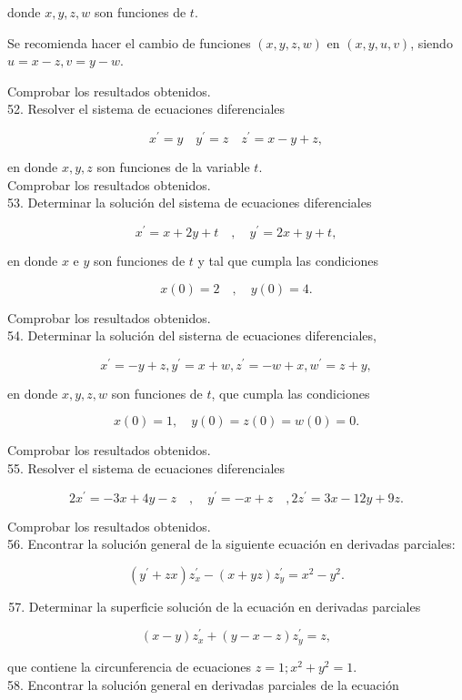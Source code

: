 \documentclass[10pt]{article}
\theoremstyle{plain}
\theoremstyle{definition}
\theoremstyle{remark}
\begin{document}
donde $x, y, z, w$ son funciones de $t$.


Se recomienda hacer el cambio de funciones $(x, y, z, w)$ en $(x, y, u, v)$, siendo $u=x-z, v=y-w$.

Comprobar los resultados obtenidos.\\
52. Resolver el sistema de ecuaciones diferenciales

$$
x^{\prime}=y \quad y^{\prime}=z \quad z^{\prime}=x-y+z,
$$

en donde $x, y, z$ son funciones de la variable $t$.\\
Comprobar los resultados obtenidos.\\
53. Determinar la solución del sistema de ecuaciones diferenciales

$$
x^{\prime}=x+2 y+t \quad, \quad y^{\prime}=2 x+y+t,
$$

en donde $x$ e $y$ son funciones de $t$ y tal que cumpla las condiciones

$$
x(0)=2 \quad, \quad y(0)=4 .
$$

Comprobar los resultados obtenidos.\\
54. Determinar la solución del sisterna de ecuaciones diferenciales,

$$
x^{\prime}=-y+z, y^{\prime}=x+w, z^{\prime}=-w+x, w^{\prime}=z+y,
$$

en donde $x, y, z, w$ son funciones de $t$, que cumpla las condiciones

$$
x(0)=1, \quad y(0)=z(0)=w(0)=0 .
$$

Comprobar los resultados obtenidos.\\
55. Resolver el sistema de ecuaciones diferenciales

$$
2 x^{\prime}=-3 x+4 y-z \quad, \quad y^{\prime}=-x+z \quad, 2 z^{\prime}=3 x-12 y+9 z .
$$

Comprobar los resultados obtenidos.\\
56. Encontrar la solución general de la siguiente ecuación en derivadas parciales:

$$
\left(y^{\prime}+z x\right) z_{x}^{\prime}-(x+y z) z_{y}^{\prime}=x^{2}-y^{2} .
$$

\begin{enumerate}
  \setcounter{enumi}{56}
  \item Determinar la superficie solución de la ecuación en derivadas parciales
\end{enumerate}

$$
(x-y) z_{x}^{\prime}+(y-x-z) z_{y}^{\prime}=z,
$$

que contiene la circunferencia de ecuaciones $z=1 ; x^{2}+y^{2}=1$.\\
58. Encontrar la solución general en derivadas parciales de la ecuación
\end{document}

